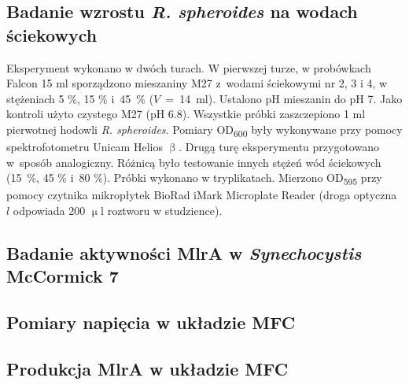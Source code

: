 \subsection{Badanie wzrostu \textit{R. spheroides} na wodach ściekowych}\label{subsec:rhodobacter}
Eksperyment wykonano w dwóch turach.
W pierwszej turze, w probówkach Falcon 15 ml sporządzono
mieszaniny M27 z~wodami ściekowymi nr 2, 3 i 4,
w stężeniach 5 \%, 15 \% i~45~\% ($V$~=~14~ml).
Ustalono pH mieszanin do pH 7.
Jako kontroli użyto czystego M27 (pH 6.8).
Wszystkie próbki zaszczepiono 1 ml pierwotnej hodowli
\textit{R. spheroides}.
Pomiary OD\textsubscript{600} były wykonywane przy pomocy
spektrofotometru Unicam Helios $\upbeta$.
Drugą turę eksperymentu przygotowano w~sposób analogiczny.
Różnicą było testowanie innych stężeń wód ściekowych
(15~\%, 45 \% i~80 \%).
Próbki wykonano w tryplikatach.
Mierzono OD\textsubscript{595} przy pomocy czytnika
mikropłytek BioRad iMark Microplate Reader
(droga optyczna $l$ odpowiada 200 $\upmu$l roztworu w studzience).

\subsection{Badanie aktywności MlrA w \textit{Synechocystis} McCormick 7}\label{subsec:mlra}


\subsection{Pomiary napięcia w układzie MFC}\label{subsec:volt}

\subsection{Produkcja MlrA w układzie MFC}\label{subsec:mfc}